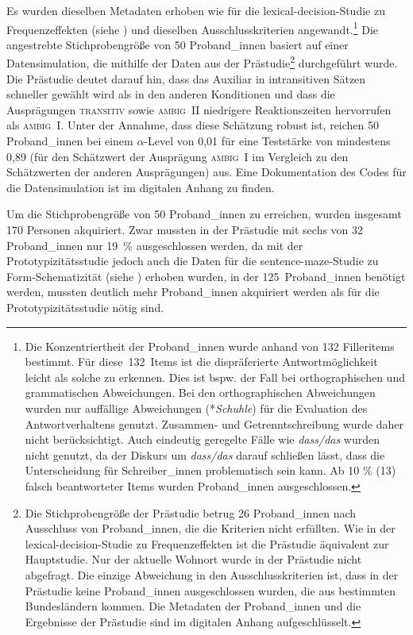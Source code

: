 Es wurden dieselben Metadaten erhoben wie für die lexical-decision-Studie zu Frequenzeffekten (siehe ) und dieselben Ausschlusskriterien angewandt.\footnote{Die Konzentriertheit der Proband\_innen wurde anhand von 132 Filleritems bestimmt. Für diese~132~Items ist die dispräferierte Antwortmöglichkeit leicht als solche zu erkennen. Dies ist bspw. der Fall bei orthographischen und grammatischen Abweichungen. Bei den orthographischen Abweichungen wurden nur auffällige Abweichungen (*\textit{Schuhle}) für die Evaluation des Antwortverhaltens genutzt. Zusammen- und Getrenntschreibung wurde daher nicht berücksichtigt. Auch eindeutig geregelte Fälle wie \textit{dass/das} wurden nicht genutzt, da der Diskurs um \textit{dass/das} darauf schließen lässt, dass die Unterscheidung für Schreiber\_innen problematisch sein kann. Ab 10 \% (13) falsch beantworteter Items wurden Proband\_innen ausgeschlossen.} Die angestrebte Stichprobengröße von 50 Proband\_innen basiert auf einer Datensimulation, die mithilfe der Daten aus der Prästudie\footnote{Die Stichprobengröße der Prästudie betrug 26 Proband\_innen nach Ausschluss von Proband\_innen, die die Kriterien nicht erfüllten. Wie in der lexical-decision-Studie zu Frequenzeffekten ist die Prästudie äquivalent zur Hauptstudie. Nur der aktuelle Wohnort wurde in der Prästudie nicht abgefragt. Die einzige Abweichung in den Ausschlusskriterien ist, dass in der Prästudie keine Proband\_innen ausgeschlossen wurden, die aus bestimmten Bundesländern kommen. Die Metadaten der Proband\_innen und die Ergebnisse der Prästudie sind im digitalen Anhang aufgeschlüsselt.} durchgeführt wurde. Die Prästudie deutet darauf hin, dass das Auxiliar in intransitiven Sätzen schneller gewählt wird als in den anderen Konditionen und dass die Ausprägungen \textsc{transitiv} sowie \textsc{ambig~II} niedrigere Reaktionszeiten hervorrufen als \textsc{ambig~I}. Unter der Annahme, dass diese Schätzung robust ist, reichen 50 Pro\-\mbox{band\_in}\-nen bei einem $\alpha$-Level von 0,01 für eine Teststärke von mindestens 0,89 (für den Schätzwert der Ausprägung \textsc{ambig~I} im Vergleich zu den Schätzwerten der anderen Ausprägungen) aus. Eine Dokumentation des Codes für die Datensimulation ist im digitalen Anhang zu finden.

 

Um die Stichprobengröße von 50 Proband\_innen zu erreichen, wurden insgesamt 170 Personen akquiriert. Zwar mussten in der Prästudie mit sechs von 32 Proband\_innen nur 19~\% ausgeschlossen werden, da mit der Prototypizitätsstudie jedoch auch die Daten für die sentence-maze-Studie zu Form-Schematizität (siehe ) erhoben wurden, in der 125~Proband\_innen benötigt werden, mussten deutlich mehr Proband\_innen akquiriert werden als für die Prototypizitätsstudie nötig sind.

